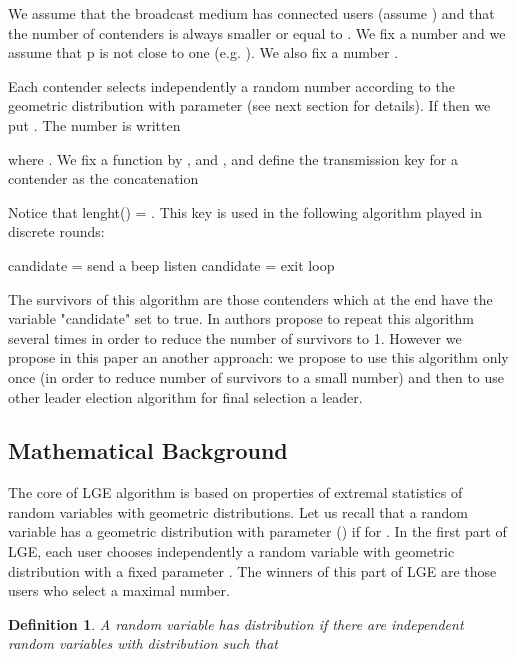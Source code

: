\documentclass[proceedings]{dmtcs}
\newtheorem{definition}{Definition}
\begin{document}
We assume that the broadcast medium has  connected users (assume ) and that
the number of contenders  is always smaller or equal to . 
We fix a number  and we assume that p is not close to one (e.g.
). We also fix a number .

Each  contender  selects independently a random number  according to the geometric distribution with parameter  (see next section for details). 
If  then we put . 
The number  is written

where . We fix a function  by ,
 and , 
and define the transmission key  for a contender  as the concatenation

Notice that lenght() = .
This key  is used in the following algorithm played in discrete rounds:
\begin{algorithmic}[1]
\STATE candidate = \TRUE
{}
\STATE send a beep
\ELSE
	\STATE listen
		\STATE candidate = \FALSE
		\STATE exit loop
	\ENDIF
\ENDIF
\ENDFOR
\end{algorithmic}

The survivors of this algorithm are those contenders which at the end have the variable "candidate"
set to true. In \cite{DBLP:conf/mascots/JacquetMM13} authors propose to repeat this algorithm 
several times in order to reduce the number of survivors to 1. However we propose in this paper 
an another approach: we propose to use this algorithm only once (in order to reduce number 
of survivors to a small number) and then to use other leader election algorithm for final selection a leader.
 
\subsection{Mathematical Background}

The core of LGE algorithm is based on properties of extremal statistics 
of random variables with geometric distributions.  
Let us recall that a random variable  has a geometric distribution 
with parameter  ()
if  for . 
In the first part of LGE, each user chooses independently a random variable with geometric
distribution with a fixed parameter . The winners of this part of LGE are those users who select
a maximal number.  

\begin{definition}
A random variable  has distribution  if there are independent random variables 
 with distribution  such that 
\end{definition}
\end{document}
